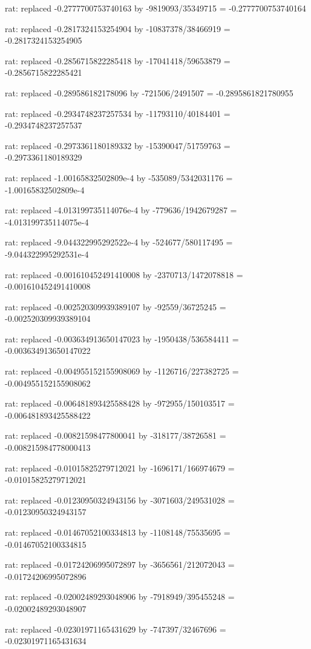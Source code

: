 \documentclass[a4paper,10pt]{article}
\begin{document}
\begin{eulernotebook}
\begin{eulercomment}
\begin{eulercomment}
\begin{eulercomment}
\begin{eulercomment}
\begin{eulercomment}
\begin{eulercomment}
\begin{eulercomment}
\begin{eulercomment}
\begin{eulercomment}
\begin{eulercomment}
\begin{eulercomment}
\begin{eulercomment}
\begin{eulercomment}
\begin{eulercomment}
\begin{eulercomment}
\begin{eulercomment}
\begin{euleroutput}
  rat: replaced -0.2777700753740163 by -9819093/35349715 = -0.2777700753740164
  
  rat: replaced -0.2817324153254904 by -10837378/38466919 = -0.2817324153254905
  
  rat: replaced -0.2856715822285418 by -17041418/59653879 = -0.2856715822285421
  
  rat: replaced -0.289586182178096 by -721506/2491507 = -0.2895861821780955
  
  rat: replaced -0.2934748237257534 by -11793110/40184401 = -0.2934748237257537
  
  rat: replaced -0.2973361180189332 by -15390047/51759763 = -0.2973361180189329
  
  rat: replaced -1.00165832502809e-4 by -535089/5342031176 = -1.00165832502809e-4
  
  rat: replaced -4.013199735114076e-4 by -779636/1942679287 = -4.013199735114075e-4
  
  rat: replaced -9.044322995292522e-4 by -524677/580117495 = -9.044322995292531e-4
  
  rat: replaced -0.001610452491410008 by -2370713/1472078818 = -0.001610452491410008
  
  rat: replaced -0.002520309939389107 by -92559/36725245 = -0.002520309939389104
  
  rat: replaced -0.003634913650147023 by -1950438/536584411 = -0.003634913650147022
  
  rat: replaced -0.004955152155908069 by -1126716/227382725 = -0.004955152155908062
  
  rat: replaced -0.006481893425588428 by -972955/150103517 = -0.006481893425588422
  
  rat: replaced -0.00821598477800041 by -318177/38726581 = -0.008215984778000413
  
  rat: replaced -0.01015825279712021 by -1696171/166974679 = -0.01015825279712021
  
  rat: replaced -0.01230950324943156 by -3071603/249531028 = -0.01230950324943157
  
  rat: replaced -0.01467052100334813 by -1108148/75535695 = -0.01467052100334815
  
  rat: replaced -0.01724206995072897 by -3656561/212072043 = -0.01724206995072896
  
  rat: replaced -0.02002489293048906 by -7918949/395455248 = -0.02002489293048907
  
  rat: replaced -0.02301971165431629 by -747397/32467696 = -0.02301971165431634
  

\end{euleroutput}
\end{eulercomment}
\end{eulercomment}
\end{eulercomment}
\end{eulercomment}
\end{eulercomment}
\end{eulercomment}
\end{eulercomment}
\end{eulercomment}
\end{eulercomment}
\end{eulercomment}
\end{eulercomment}
\end{eulercomment}
\end{eulercomment}
\end{eulercomment}
\end{eulercomment}
\end{eulercomment}
\end{eulernotebook}
\end{document}
